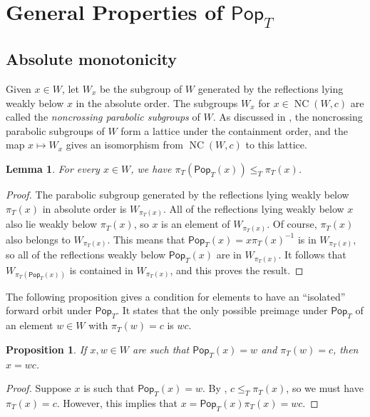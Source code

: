 \documentclass[10pt,a4paper]{amsart}
\newtheorem{lemma}[lemma]{Lemma}
\newtheorem{prop}[prop]{Proposition}
\newcommand{\darkblue}{\color{darkblue}}
\newcommand{\defn}[1]{\emph{\darkblue #1}}
\newcommand{\pop}{\mathsf{Pop}}
\DeclareMathOperator{\NC}{NC}
\begin{document}
\setcounter{figure}{4}
\section{General Properties of \texorpdfstring{$\pop_T$}{Pop}}
\label{sec:general_properties}

\subsection{Absolute monotonicity}

Given $x\in W$, let $W_x$ be the subgroup of $W$ generated by the reflections lying weakly below $x$ in the absolute order. The subgroups $W_x$ for $x\in \NC(W,c)$ are called the \defn{noncrossing parabolic subgroups} of $W$. As discussed in \cite{ReadingNoncrossing}, the noncrossing parabolic subgroups of $W$ form a lattice under the containment order, and the map $x\mapsto W_x$ gives an isomorphism from $\NC(W,c)$ to this lattice. 

\begin{lemma}
\label{lem:monotone}
For every $x \in W$, we have $\pi_T(\pop_T(x))\leq_T \pi_T(x)$.
\end{lemma}
\begin{proof}
The parabolic subgroup generated by the reflections lying weakly below $\pi_T(x)$ in absolute order is $W_{\pi_T(x)}$. All of the reflections lying weakly below $x$ also lie weakly below $\pi_T(x)$, so $x$ is an element of $W_{\pi_T(x)}$. Of course, $\pi_T(x)$ also belongs to $W_{\pi_T(x)}$. This means that $\pop_T(x)=x\pi_T(x)^{-1}$ is in $W_{\pi_T(x)}$, so all of the reflections weakly below $\pop_T(x)$ are in $W_{\pi_T(x)}$. It follows that 
$W_{\pi_T(\pop_T(x))}$ is contained in $W_{\pi_T(x)}$, and this proves the result. 
\end{proof}

The following proposition gives a condition for elements to have an ``isolated'' forward orbit under $\pop_T$. It states that the only possible preimage under $\pop_T$ of an element $w \in W$ with $\pi_T(w)=c$ is $wc$.

\begin{prop}
\label{prop:preimages}
If $x,w\in W$ are such that $\pop_T(x)=w$ and $\pi_T(w)=c$, then $x=wc$.
\end{prop}

\begin{proof}
Suppose $x$ is such that $\pop_T(x)=w$.  By , $c\leq_T\pi_T(x)$, so we must have $\pi_T(x)=c$. However, this implies that $x=\pop_T(x)\pi_T(x)=wc$.  
\end{proof}
\end{document}
